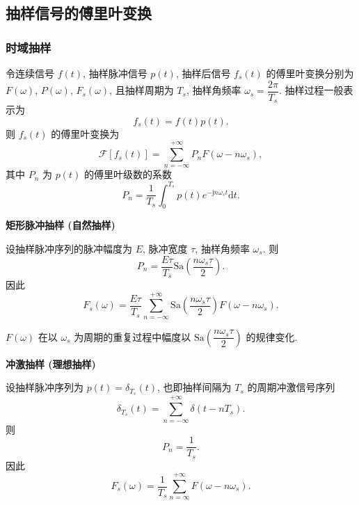 \subsection{抽样信号的傅里叶变换} \label{3 抽样信号的傅里叶变换}
\subsubsection{时域抽样}
令连续信号 $f(t)$, 抽样脉冲信号 $p(t)$, 抽样后信号 $f_s(t)$ 的傅里叶变换分别为 $F(\omega)$, $P(\omega)$, $F_s(\omega)$, 且抽样周期为 $T_s$, 抽样角频率 $\omega_s=\dfrac{2\pi}{T_s}$. 抽样过程一般表示为
\begin{equation}
    f_s(t)=f(t)p(t).
\end{equation}
则 $f_s(t)$ 的傅里叶变换为
\begin{equation}
    \mathcal{F}[f_s(t)]=\sum_{n=-\infty}^{+\infty}P_nF(\omega-n\omega_s),
\end{equation}
其中 $P_n$ 为 $p(t)$ 的傅里叶级数的系数
\begin{equation}
    P_n=\frac{1}{T_s}\int_{0}^{T_s}p(t)e^{-\mathrm{j}n\omega_s t}\mathrm{d}t.
\end{equation}

\textbf{矩形脉冲抽样 (自然抽样)}

设抽样脉冲序列的脉冲幅度为 $E$, 脉冲宽度 $\tau$, 抽样角频率 $\omega_s$. 则
\begin{equation}
    P_n=\frac{E\tau}{T_s}\mathrm{Sa}\left(\frac{n\omega_s\tau}{2}\right).
\end{equation}
因此
\begin{equation}
    F_s(\omega)=\frac{E\tau}{T_s}\sum_{n=-\infty}^{+\infty}\mathrm{Sa}\left(\frac{n\omega_s\tau}{2}\right)F(\omega-n\omega_s).
\end{equation}

$F(\omega)$ 在以 $\omega_s$ 为周期的重复过程中幅度以 $\mathrm{Sa}\left(\dfrac{n\omega_s\tau}{2}\right)$ 的规律变化.

\textbf{冲激抽样 (理想抽样)}

设抽样脉冲序列为 $p(t)=\delta_{T_s}(t)$, 也即抽样间隔为 $T_s$ 的周期冲激信号序列
\begin{equation}
    \delta_{T_s}(t)=\sum_{n=-\infty}^{+\infty}\delta(t-nT_s).
\end{equation}
则
\begin{equation}
    P_n=\frac{1}{T_s}.
\end{equation}
因此
\begin{equation}
    F_s(\omega)=\frac{1}{T_s}\sum_{n=\infty}^{+\infty}F(\omega-n\omega_s).
\end{equation}

